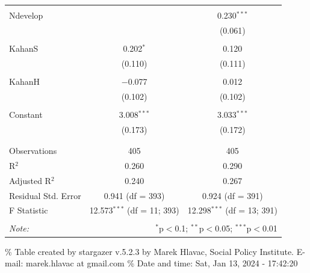 \documentclass[
]{article}
\begin{document}
\begin{table}[!htbp]
\begin{tabular}{@{\extracolsep{5pt}}lcc}
  & & \\ 
 Ndevelop &  & 0.230$^{***}$ \\ 
  &  & (0.061) \\ 
  & & \\ 
 KahanS & 0.202$^{*}$ & 0.120 \\ 
  & (0.110) & (0.111) \\ 
  & & \\ 
 KahanH & $-$0.077 & 0.012 \\ 
  & (0.102) & (0.102) \\ 
  & & \\ 
 Constant & 3.008$^{***}$ & 3.033$^{***}$ \\ 
  & (0.173) & (0.172) \\ 
  & & \\ 
\hline \\[-1.8ex] 
Observations & 405 & 405 \\ 
R$^{2}$ & 0.260 & 0.290 \\ 
Adjusted R$^{2}$ & 0.240 & 0.267 \\ 
Residual Std. Error & 0.941 (df = 393) & 0.924 (df = 391) \\ 
F Statistic & 12.573$^{***}$ (df = 11; 393) & 12.298$^{***}$ (df = 13; 391) \\ 
\hline 
\hline \\[-1.8ex] 
\textit{Note:}  & \multicolumn{2}{r}{$^{*}$p$<$0.1; $^{**}$p$<$0.05; $^{***}$p$<$0.01} \\ 
\end{tabular} 
\end{table} 
\endgroup

\begingroup\setlength{\tabcolsep}{1pt}

\renewcommand{\arraystretch}{0.7}

\% Table created by stargazer v.5.2.3 by Marek Hlavac, Social Policy
Institute. E-mail: marek.hlavac at gmail.com \% Date and time: Sat, Jan
13, 2024 - 17:42:20
\end{document}
